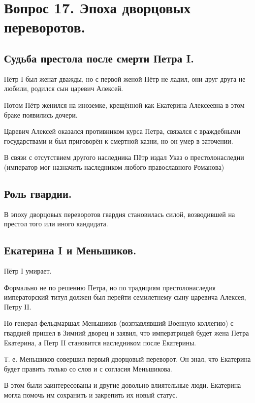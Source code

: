 \section{Вопрос 17. Эпоха дворцовых переворотов.}

\subsection{Судьба престола после смерти Петра I.}

Пётр I был женат дважды, но с первой женой Пётр не ладил, они друг друга не любили, родился сын царевич Алексей. 

Потом Пётр женился на иноземке, крещённой как Екатерина Алексеевна в этом браке появились дочери.

Царевич Алексей оказался противником курса Петра, связался с враждебными государствами и был приговорён к смертной казни, но он умер в заточении.

В связи с отсутствием другого наследника Пётр издал Указ о престолонаследии (император мог назначить наследником любого православного Романова)

\subsection{Роль гвардии.}

В эпоху дворцовых переворотов гвардия становилась силой, возводившей на престол того или иного кандидата.

\subsection{Екатерина I и Меньшиков.}

Пётр I умирает. 

Формально не по решению Петра, но по традициям престолонаследия императорский титул должен был перейти семилетнему сыну царевича Алексея, Петру II.

Но генерал-фельдмаршал Меньшиков (возглавлявший Военную коллегию) с гвардией пришел в Зимний дворец и заявил, что императрицей будет жена Петра Екатерина, а Петр II становится наследником после Екатерины. 

Т. е. Меньшиков совершил первый дворцовый переворот. Он знал, что Екатерина будет править только со слов и с согласия Меньшикова. 

В этом были заинтересованы и другие довольно влиятельные люди. Екатерина могла помочь им сохранить и закрепить их новый статус.

